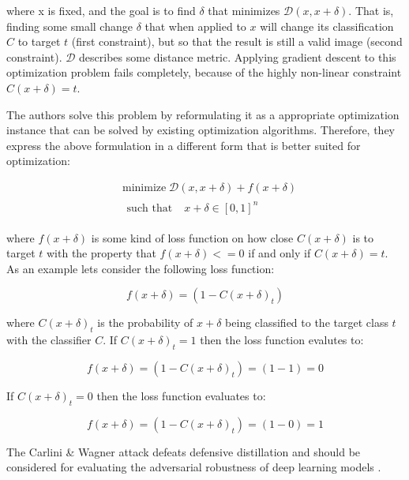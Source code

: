 where x is fixed, and the goal is to find $\delta$ that minimizes
$\mathcal{D}(x, x + \delta)$. That is, finding some small change $\delta$ that
when applied to $x$ will change its classification $C$ to target $t$ (first
constraint), but so that the result is still a valid image (second constraint).
$\mathcal{D}$ describes some distance metric. Applying gradient descent to this
optimization problem fails completely, because of the highly non-linear
constraint $C(x + \delta) = t$.

The authors solve this problem by reformulating it as a appropriate optimization
instance that can be solved by existing optimization algorithms. Therefore, they
express the above formulation in a different form that is better suited for
optimization:

\begin{align}
    & \text{minimize} \; \mathcal{D}(x, x + \delta) + f(x + \delta) \\
    & \begin{aligned}
        \text{such that}  \; & x + \delta \in [0, 1]^n  
    \end{aligned}
\end{align}


where $f(x + \delta)$ is some kind of loss function on how close $C(x + \delta)$
is to target $t$ with the property that $f(x + \delta) <= 0$ if and only if $C(x + \delta) =
t$. As an example lets consider the following loss function:

\begin{equation}
    f(x + \delta) = (1 - C(x + \delta)_{t})
\end{equation}

where $C(x + \delta)_{t}$ is the probability of $x + \delta$ being classified to the target
class $t$ with the classifier $C$. If $C(x + \delta)_{t}=1$ then the loss function
evalutes to:

\begin{equation}
    f(x + \delta) = (1 - C(x + \delta)_{t}) = (1 - 1) = 0
\end{equation}

If $C(x + \delta)_{t}=0$ then the loss function evaluates to:

\begin{equation}
    f(x + \delta) = (1 - C(x + \delta)_{t}) = (1 - 0) = 1
\end{equation}

The Carlini \& Wagner attack defeats defensive distillation
\cite{papernot2016distillation} and should be considered for evaluating the
adversarial robustness of deep learning models \cite{carlini2019onrobustness}.